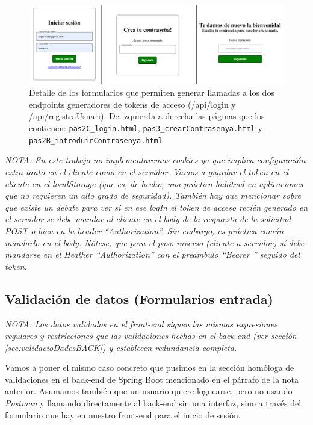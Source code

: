 \documentclass[a4paper,12pt]{report}
\begin{document}
	\setlength{\belowcaptionskip}{3pt}
	\FloatBarrier
	\begin{figure}[H]
		\centering
		\caption{Detalle de los formularios que permiten generar llamadas a los dos endpoints generadores de tokens de acceso (/api/login y /api/registraUsuari). De izquierda a derecha las páginas que los contienen: \texttt{pas2C\_login.html}, \texttt{pas3\_crearContrasenya.html} y \texttt{pas2B\_introduirContrasenya.html}}
		\includegraphics[width=1\textwidth]{img/figPaginesQueExpedeixenJWT.png}
		
		\label{fig:figPaginesQueExpedeixenJWT} 
	\end{figure}
	\FloatBarrier
	
	
	
\textit{NOTA: En este trabajo no implementaremos cookies ya que implica configuración extra tanto en el cliente como en el servidor. Vamos a guardar el token en el cliente en el localStorage (que es, de hecho, una práctica habitual en aplicaciones que no requieren un alto grado de seguridad). También hay que mencionar sobre que existe un debate para ver si en ese logIn el token de acceso recién generado en el servidor se debe mandar al cliente en el body de la respuesta de la solicitud POST \textit{o bien} en la header ``Authorization''. Sin embargo, es práctica común mandarlo en el body. Nótese, que para el paso inverso (cliente a servidor) sí debe mandarse en el Heather ``Authorization'' con el preámbulo ``Bearer '' seguido del token. }
	
	
	
	\subsection{Validación de datos (Formularios entrada)}
	\label{sec:validacioDadesFRONT}
	
	\textit{NOTA: Los datos validados en el front-end siguen las mismas expresiones regulares y restricciones que las validaciones hechas en el back-end (ver sección \ref{sec:validacioDadesBACK}) y establecen redundancia completa.}
	
	Vamos a poner el mismo caso concreto que pusimos en la sección homóloga de validaciones en el back-end de Spring Boot mencionado en el párrafo de la nota anterior. Asumamos también que un usuario quiere loguearse, pero no usando \textit{Postman} y llamando directamente al back-end sin una interfaz, sino a través del formulario que hay en nuestro front-end para el inicio de sesión.
	
\end{document}
